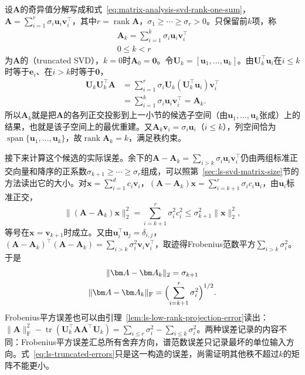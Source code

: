 设$\bm A$的奇异值分解写成和式~\eqref{eq:matrix-analysis-svd-rank-one-sum}，$\bm A=\sum_{i=1}^r\sigma_i\bm u_i\bm v_i^\top$，其中$r=\operatorname{rank}\bm A$，$\sigma_1\geq\cdots\geq\sigma_r>0$。只保留前$k$项，称
\begin{equation}
\begin{gathered}
\bm A_k=\sum_{i=1}^k\sigma_i\bm u_i\bm v_i^\top\\
0\leq k<r
\end{gathered}
\label{eq:matrix-analysis-truncated-svd}
\end{equation}
为$\bm A$的（truncated SVD），$k=0$时$\bm A_0=\bm0$。令$\bm U_k=[\bm u_1,\ldots,\bm u_k]$。由$\bm U_k^\top\bm u_i$在$i\leq k$时等于$\bm e_i$、在$i>k$时等于$\bm0$，
\[
 \begin{aligned}
 \bm U_k\bm U_k^\top\bm A
 &=\sum_{i=1}^r\sigma_i\bm U_k(\bm U_k^\top\bm u_i)\bm v_i^\top\\
 &=\sum_{i=1}^k\sigma_i\bm u_i\bm v_i^\top=\bm A_k .
 \end{aligned}
\]
所以$\bm A_k$就是把$\bm A$的各列正交投影到上一小节的候选子空间（由$\bm u_1,\ldots,\bm u_k$张成）上的结果，也就是该子空间上的最优重建。又$\bm A_k\bm v_i=\sigma_i\bm u_i$（$i\leq k$），列空间恰为$\operatorname{span}\{\bm u_1,\ldots,\bm u_k\}$，故$\operatorname{rank}\bm A_k=k$，满足秩约束。

接下来计算这个候选的实际误差。余下的$\bm A-\bm A_k=\sum_{i>k}\sigma_i\bm u_i\bm v_i^\top$仍由两组标准正交向量和降序的正系数$\sigma_{k+1}\geq\cdots\geq\sigma_r$组成，可以照第~\ref{sec:ls-svd-matrix-size}节的方法读出它的大小。对$\bm x=\sum_{i=1}^dc_i\bm v_i$，$(\bm A-\bm A_k)\bm x=\sum_{i=k+1}^r\sigma_ic_i\bm u_i$，由$\bm u_i$标准正交，
\[
 \lVert(\bm A-\bm A_k)\bm x\rVert_2^2=\sum_{i=k+1}^r\sigma_i^2c_i^2\leq\sigma_{k+1}^2\lVert\bm x\rVert_2^2,
\]
等号在$\bm x=\bm v_{k+1}$时成立。又由$\bm u_i^\top\bm u_j=\delta_{i,j}$，$(\bm A-\bm A_k)^\top(\bm A-\bm A_k)=\sum_{i>k}\sigma_i^2\bm v_i\bm v_i^\top$，取迹得Frobenius范数平方$\sum_{i>k}\sigma_i^2$。于是
\begin{equation}
\begin{gathered}
\lVert\bm A-\bm A_k\rVert_2=\sigma_{k+1}\\
\lVert\bm A-\bm A_k\rVert_{\mathrm F}
 =\Bigl(\sum_{i=k+1}^r\sigma_i^2\Bigr)^{1/2}.
\end{gathered}
\label{eq:ls-truncated-errors}
\end{equation}
Frobenius平方误差也可以由引理~\ref{lem:ls-low-rank-projection-error}读出：$\lVert\bm A\rVert_{\mathrm F}^2-\operatorname{tr}(\bm U_k^\top\bm A\bm A^\top\bm U_k)=\sum_{i\leq r}\sigma_i^2-\sum_{i\leq k}\sigma_i^2$。两种误差记录的内容不同：Frobenius平方误差汇总所有舍弃方向，谱范数误差只记录最坏的单位输入方向。式~\eqref{eq:ls-truncated-errors}只是这一构造的误差，尚需证明其他秩不超过$k$的矩阵不能更小。

